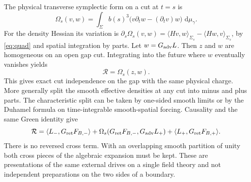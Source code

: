 \documentclass[11pt]{article}
\newcommand{\dd}{\,\mathrm d}
\newcommand{\Rret}{G_{\rm ret}}
\newcommand{\Radv}{G_{\rm adv}}
\numberwithin{equation}{section}
\begin{document}
The physical transverse symplectic form on a cut at $t=s$ is
\begin{equation}
 \Omega_s(v,w)=\int_\Sigma b(s)^3
        \big(v\partial_t w-(\partial_t v)w\big)\,\dd\mu_\gamma .
 \label{eq:symp}
\end{equation}
For the density Hessian its variation is
$\partial_s\Omega_s(v,w)=\langle Hv,w\rangle_{\Sigma_s}-\langle Hw,v\rangle_{\Sigma_s}$,
by \eqref{eq:quad} and spatial integration by parts. Let $w=\Radv L$. Then $z$ and $w$ are homogeneous on an open gap cut. Integrating into the future where $w$ eventually vanishes yields
\begin{equation}
              \mathcal R=\Omega_s(z,w) .
 \label{eq:relay}
\end{equation}
This gives exact cut independence on the gap with the same physical charge. More generally split the smooth effective densities at any cut into minus and plus parts. The characteristic split can be taken by one-sided smooth limits or by the Duhamel formula on time-integrable smooth-spatial forcing. Causality and the same Green identity give
\begin{equation}
 \mathcal R=\langle L_-,\Rret F_{B,-}\rangle
     +\Omega_s(\Rret F_{B,-},\Radv L_+)
     +\langle L_+,\Rret F_{B,+}\rangle .
 \label{eq:split}
\end{equation}
There is no reversed cross term. With an overlapping smooth partition of unity both cross pieces of the algebraic expansion must be kept. These are presentations of the same external drives on a single field theory and not independent preparations on the two sides of a boundary.
\end{document}
